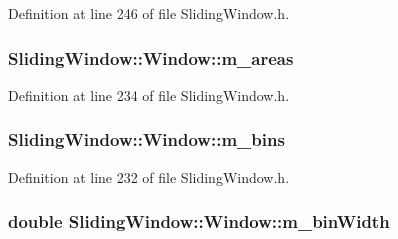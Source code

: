Definition at line 246 of file Sliding\+Window.\+h.

\subsubsection[{\texorpdfstring{m\+\_\+areas}{m_areas}}]{ Sliding\+Window\+::\+Window\+::m\+\_\+areas\hspace{0.3cm}{\ttfamily [protected]}}\hypertarget{classSlidingWindow_1_1Window_ac3654a276b9c1e8ca2d03a18ab23336d}{}\label{classSlidingWindow_1_1Window_ac3654a276b9c1e8ca2d03a18ab23336d}


Definition at line 234 of file Sliding\+Window.\+h.

\subsubsection[{\texorpdfstring{m\+\_\+bins}{m_bins}}]{ Sliding\+Window\+::\+Window\+::m\+\_\+bins\hspace{0.3cm}{\ttfamily [protected]}}\hypertarget{classSlidingWindow_1_1Window_a3f4acfc8faac69f90803bdbce13828bc}{}\label{classSlidingWindow_1_1Window_a3f4acfc8faac69f90803bdbce13828bc}


Definition at line 232 of file Sliding\+Window.\+h.

\subsubsection[{\texorpdfstring{m\+\_\+bin\+Width}{m_binWidth}}]{\setlength{\rightskip}{0pt plus 5cm}double Sliding\+Window\+::\+Window\+::m\+\_\+bin\+Width\hspace{0.3cm}{\ttfamily [protected]}}\hypertarget{classSlidingWindow_1_1Window_a290b3c6a5a678ce8651b650758e20401}{}\label{classSlidingWindow_1_1Window_a290b3c6a5a678ce8651b650758e20401}


